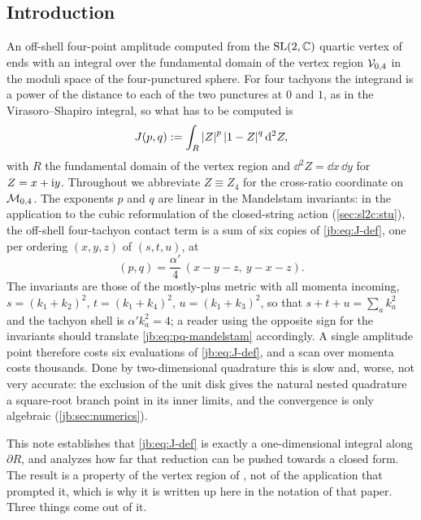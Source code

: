 \subsection{Introduction}
\label{jb:sec:intro}


An off-shell four-point amplitude computed from the $\mathrm{SL}(2, \mathbb{C})$ quartic vertex of
\cite{Erbin:2023:SL2CQuarticVertex} ends with an integral over the fundamental domain of the vertex
region ${\mathcal{V}}_{0,4}$ in the moduli space of the four-punctured sphere.
For four tachyons the integrand is a power of the distance to each of the two punctures at $0$ and
$1$, as in the Virasoro--Shapiro integral, so what has to be computed is
\begin{equation}
  \label{jb:eq:J-def}
  J(p, q)
    := \int_{R} {|Z|}^{p} \, {|1 - Z|}^{q} \, \mathrm{d}^2 Z,
\end{equation}
with $R$ the fundamental domain of the vertex region and $\dd^2 Z = \dd x \, \dd y$ for
$Z = x + \mathrm{i} y$.
Throughout we abbreviate $Z \equiv Z_4$ for the cross-ratio coordinate on ${\mathcal{M}}_{0,4}$.
The exponents $p$ and $q$ are linear in the Mandelstam invariants: in the application to the cubic
reformulation of the closed-string action (\cref{sec:sl2c:stu}), the off-shell four-tachyon contact term is
a sum of six copies of \eqref{jb:eq:J-def}, one per ordering $(x, y, z)$ of $(s, t, u)$, at
\begin{equation}
  \label{jb:eq:pq-mandelstam}
  (p, q)
    = \frac{\alpha'}{4} \, (x - y - z, \ y - x - z).
\end{equation}
The invariants are those of the mostly-plus metric with all momenta incoming, $s = (k_1 + k_2)^2$,
$t = (k_1 + k_4)^2$, $u = (k_1 + k_3)^2$, so that $s + t + u = \sum_a k_a^2$ and the tachyon shell
is $\alpha' k_a^2 = 4$; a reader using the opposite sign for the invariants should translate
\eqref{jb:eq:pq-mandelstam} accordingly.
A single amplitude point therefore costs six evaluations of \eqref{jb:eq:J-def}, and a scan over
momenta costs thousands.
Done by two-dimensional quadrature this is slow and, worse, not very accurate: the exclusion of the
unit disk gives the natural nested quadrature a square-root branch point in its inner limits, and
the convergence is only algebraic (\cref{jb:sec:numerics}).

This note establishes that \eqref{jb:eq:J-def} is exactly a one-dimensional integral along
$\partial R$, and analyzes how far that reduction can be pushed towards a closed form.
The result is a property of the vertex region of \cite{Erbin:2023:SL2CQuarticVertex}, not of the
application that prompted it, which is why it is written up here in the notation of that paper.
Three things come out of it.

